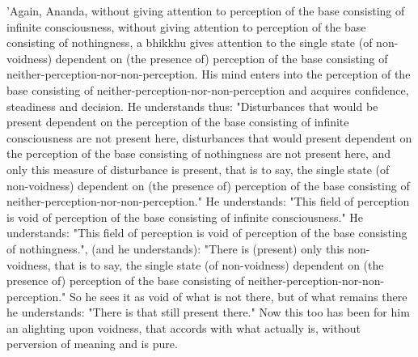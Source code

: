 \documentclass[11pt]{article}
\begin{document}
 'Again, Ananda, without giving attention to perception of the base consisting of infinite consciousness, without giving attention to perception of the base consisting of nothingness, a bhikkhu gives attention to the single state (of non-voidness) dependent on (the presence of) perception of the base consisting of neither-perception-nor-non-perception. His mind enters into the perception of the base consisting of neither-perception-nor-non-perception and acquires confidence, steadiness and decision. He understands thus: "Disturbances that would be present dependent on the perception of the base consisting of infinite consciousness are not present here, disturbances that would present dependent on the perception of the base consisting of nothingness are not present here, and only this measure of disturbance is present, that is to say, the single state (of non-voidness) dependent on (the presence of) perception of the base consisting of neither-perception-nor-non-perception." He understands: "This field of perception is void of perception of the base consisting of infinite consciousness." He understands: "This field of perception is void of perception of the base consisting of nothingness.", (and he understands): "There is (present) only this non-voidness, that is to say, the single state (of non-voidness) dependent on (the presence of) perception of the base consisting of neither-perception-nor-non-perception." So he sees it as void of what is not there, but of what remains there he understands: "There is that still present there." Now this too has been for him an alighting upon voidness, that accords with what actually is, without perversion of meaning and is pure.\\
\end{document}
